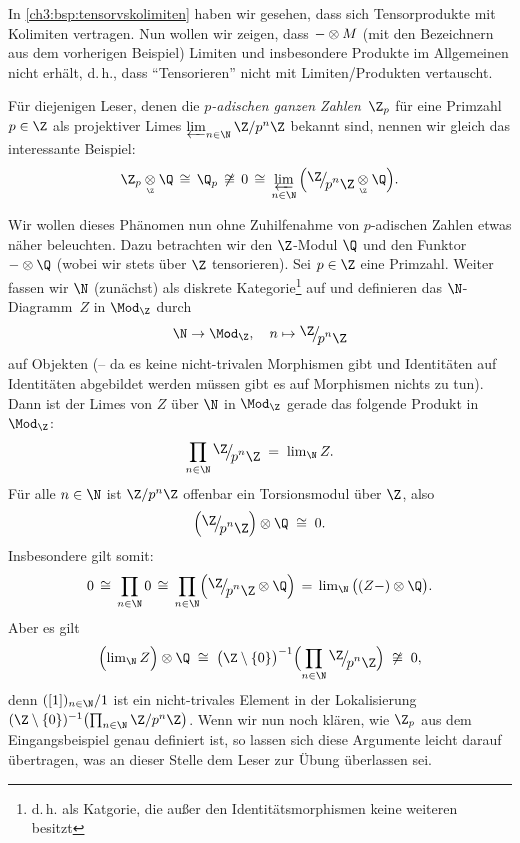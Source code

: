 \begin{thBeispiel}
    \label{ch3:bsp:tensorvslimiten}
    \newcommand{\tensorQ}{\blank\otimes\Q}
    In \cref{ch3:bsp:tensorvskolimiten} haben wir gesehen, dass sich
    Tensorprodukte mit Kolimiten vertragen. Nun wollen wir zeigen, dass
    ${-}\otimes M$ (mit den Bezeichnern aus dem vorherigen Beispiel)
    Limiten und insbesondere Produkte im Allgemeinen nicht erhält, d.\,h.,
    dass \enquote{Tensorieren} nicht mit Limiten/Produkten vertauscht.

    \noindent
    Für diejenigen Leser, denen die \emph{$p$-adischen ganzen Zahlen~$\Z_p$} 
    für eine Primzahl $p\in\Z$ als projektiver Limes $\varprojlim_{n\in\N}
    \txtZQuot{p^n}$ bekannt sind, nennen wir gleich das interessante Beispiel:
    \[ \thickmuskip=8mu
        \Z_p\underset{\scriptscriptstyle\Z}\otimes\Q \cong \Q_p \not\cong 0 
        \cong  \varprojlim_{n\in\N} \,\Bigl( \ZQuot{p^n} 
        \underset{\scriptscriptstyle\Z}\otimes \Q \Bigr)
    . \]

    \noindent
    Wir wollen dieses Phänomen nun ohne Zuhilfenahme von $p$-adischen Zahlen
    etwas näher beleuchten.  Dazu betrachten wir den $\Z$-Modul $\Q$ und den
    Funktor $\tensorQ$ (wobei wir stets über $\Z$ tensorieren). Sei $p\in\Z$
    eine Primzahl. Weiter fassen wir $\N$ (zunächst) als diskrete
    Kategorie\footnote{d.\,h. als Katgorie, die außer den Identitätsmorphismen
    keine weiteren besitzt} auf und definieren das $\N$-Diagramm~$Z$ in
    $\Mod_\Z$ durch
    \[ \N\to\Mod_\Z, \quad n\mapsto \ZQuot{p^n}  \]
    auf Objekten (-- da es keine nicht-trivalen Morphismen gibt und Identitäten
    auf Identitäten abgebildet werden müssen gibt es auf Morphismen nichts zu
    tun). Dann ist der Limes von $Z$ über $\N$ in $\Mod_\Z$ gerade das folgende
    Produkt in $\Mod_\Z$:
    \[ \prod_{n\in\N} \ZQuot{p^n} \;=\; \lim_\N Z  . \]
    Für alle $n\in\N$ ist $\txtZQuot{p^n}$ offenbar ein Torsionsmodul über $\Z$,
    also
    \[ \Bigl( \ZQuot{p^n} \Bigr) \otimes \Q  \;\cong\; 0  . \]
    Insbesondere gilt somit:
    \[ \thickmuskip=8mu
        0 \cong \prod_{n\in\N} 0 
        \cong \prod_{n\in\N} \Bigl( \ZQuot{p^n} \otimes\Q\Bigr)
        = \lim_\N \,\bigl((Z\blank)\otimes\Q\bigr)
    . \]
    Aber es gilt
    \[ \Bigl( \lim_\N Z \Bigr) \otimes \Q 
        \;\cong\; \bigl(\Z\setminus\{0\}\bigr)^{-1} 
        \Bigl( \prod_{n\in\N} \ZQuot{p^n} \Bigr)
        \;\not\cong\; 0  , 
    \]
    denn $([1])_{n\in\N}/1$ ist ein nicht-trivales Element in der Lokalisierung
    $(\Z\setminus\{0\})^{-1} \bigl( \prod_{n\in\N} \txtZQuot{p^n} \bigr)$.
    Wenn wir nun noch klären, wie $\Z_p$ aus dem Eingangsbeispiel genau
    definiert ist, so lassen sich diese Argumente leicht darauf übertragen, was
    an dieser Stelle dem Leser zur Übung überlassen sei.
    

\end{thBeispiel}
